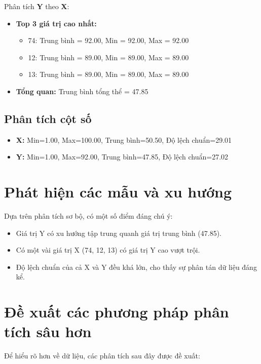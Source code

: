 \documentclass[12pt,a4paper]{article}
\begin{document}
Phân tích \textbf{Y} theo \textbf{X}:

\begin{itemize}
    \item \textbf{Top 3 giá trị cao nhất:}
    \begin{itemize}
        \item 74: Trung bình = 92.00, Min = 92.00, Max = 92.00
        \item 12: Trung bình = 89.00, Min = 89.00, Max = 89.00
        \item 13: Trung bình = 89.00, Min = 89.00, Max = 89.00
    \end{itemize}
    \item \textbf{Tổng quan:} Trung bình tổng thể = 47.85
\end{itemize}

\subsection{Phân tích cột số}
\begin{itemize}
    \item \textbf{X:} Min=1.00, Max=100.00, Trung bình=50.50, Độ lệch chuẩn=29.01
    \item \textbf{Y:} Min=1.00, Max=92.00, Trung bình=47.85, Độ lệch chuẩn=27.02
\end{itemize}

\section{Phát hiện các mẫu và xu hướng}

Dựa trên phân tích sơ bộ, có một số điểm đáng chú ý:

\begin{itemize}
    \item Giá trị Y có xu hướng tập trung quanh giá trị trung bình (47.85).
    \item Có một vài giá trị X (74, 12, 13) có giá trị Y cao vượt trội.
    \item Độ lệch chuẩn của cả X và Y đều khá lớn, cho thấy sự phân tán dữ liệu đáng kể.
\end{itemize}


\section{Đề xuất các phương pháp phân tích sâu hơn}

Để hiểu rõ hơn về dữ liệu, các phân tích sau đây được đề xuất:
\end{document}
